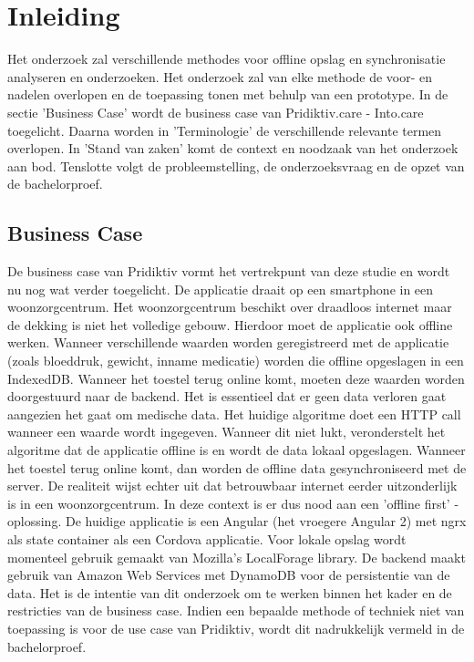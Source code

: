 \chapter{Inleiding}
\label{ch:inleiding}
Het onderzoek zal verschillende methodes voor offline opslag en synchronisatie analyseren en onderzoeken. Het onderzoek zal van elke methode de voor- en nadelen overlopen en de toepassing tonen met behulp van een prototype. In de sectie 'Business Case' wordt de business case van Pridiktiv.care - Into.care toegelicht. Daarna worden in 'Terminologie' de verschillende relevante termen overlopen. In 'Stand van zaken' komt de context en noodzaak van het onderzoek aan bod. Tenslotte volgt de probleemstelling, de onderzoeksvraag en de opzet van de bachelorproef.
\section{Business Case}
\label{sec:business-case}
De business case van Pridiktiv vormt het vertrekpunt van deze studie en wordt nu nog wat verder toegelicht. De applicatie draait op een smartphone in een woonzorgcentrum. Het woonzorgcentrum beschikt over draadloos internet maar de dekking is niet het volledige gebouw. Hierdoor moet de applicatie ook offline werken. Wanneer verschillende waarden worden geregistreerd met de applicatie (zoals bloeddruk, gewicht, inname medicatie) worden die offline opgeslagen in een IndexedDB. Wanneer het toestel terug online komt, moeten deze waarden worden doorgestuurd naar de backend. Het is essentieel dat er geen data verloren gaat aangezien het gaat om medische data. Het huidige algoritme doet een HTTP call wanneer een waarde wordt ingegeven. Wanneer dit niet lukt, veronderstelt het algoritme dat de applicatie offline is en wordt de data lokaal opgeslagen. Wanneer het toestel terug online komt, dan worden de offline data gesynchroniseerd met de server. De realiteit wijst echter uit dat betrouwbaar internet eerder uitzonderlijk is in een woonzorgcentrum. In deze context is er dus nood aan een 'offline first' -  oplossing. De huidige applicatie is een Angular (het vroegere Angular 2) met ngrx als state container als een Cordova applicatie. Voor lokale opslag wordt momenteel gebruik gemaakt van Mozilla's LocalForage library. De backend maakt gebruik van Amazon Web Services met DynamoDB voor de persistentie van de data. Het is de intentie van dit onderzoek om te werken binnen het kader en de restricties van de business case. Indien een bepaalde methode of techniek niet van toepassing is voor de use case van Pridiktiv, wordt dit nadrukkelijk vermeld in de bachelorproef.
